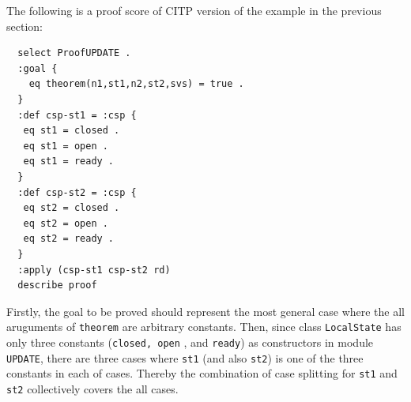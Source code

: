 \documentclass[12pt]{report}
\begin{document}
The following is a proof score of CITP version of the example in the previous section:
\small
\begin{verbatim}
  select ProofUPDATE .
  :goal {
    eq theorem(n1,st1,n2,st2,svs) = true .
  }
  :def csp-st1 = :csp {
   eq st1 = closed .
   eq st1 = open .
   eq st1 = ready .
  }
  :def csp-st2 = :csp {
   eq st2 = closed .
   eq st2 = open .
   eq st2 = ready .
  }
  :apply (csp-st1 csp-st2 rd)
  describe proof
\end{verbatim}
\normalsize
Firstly, the goal to be proved should represent the most general case
where the all aruguments of {\tt theorem} are arbitrary constants.
Then, since class {\tt LocalState} has only
three constants ({\tt closed, open} , and {\tt ready}) as constructors
in module {\tt UPDATE}, there are three cases where {\tt st1} (and
also {\tt st2}) is one of the three constants in each of cases. Thereby
the combination of case splitting for {\tt st1} and {\tt st2}
collectively covers the all cases.
\end{document}
